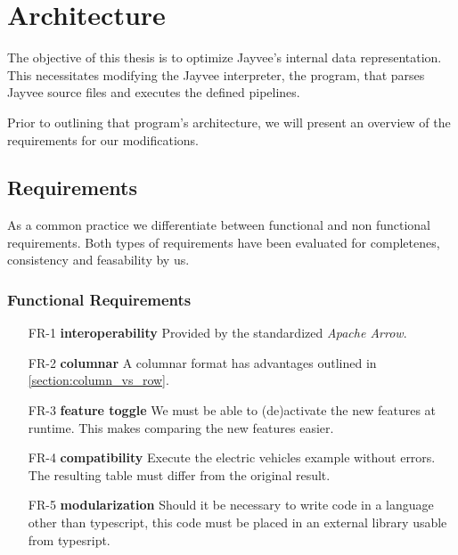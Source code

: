 \chapter{Architecture}
\label{chapter:Architecture}

The objective of this thesis is to optimize Jayvee's internal data representation.
This necessitates modifying the Jayvee interpreter, the program, that parses Jayvee source files and executes the defined pipelines.

Prior to outlining that program's architecture, we will present an overview of the requirements for our modifications.

\section{Requirements}
\label{section:Requirements}

As a common practice we differentiate between functional and non functional requirements.
Both types of requirements have been evaluated for completenes, consistency and feasability by us.

\subsection{Functional Requirements}
\label{subsection:FunctionalRequirements}

\begin{enumerate}
	\item[FR-1] \textbf{interoperability} Provided by the standardized \emph{Apache Arrow}.
	\item[FR-2] \textbf{columnar} A columnar format has advantages outlined in \ref{section:column_vs_row}.
	\item[FR-3]\label{fr:runtime} \textbf{feature toggle} We must be able to (de)activate the new features at runtime.
	      This makes comparing the new features easier. %
	\item[FR-4] \textbf{compatibility} Execute the electric vehicles example %
	      without errors.
	      The resulting table must differ from the original result.
	\item[FR-5] \textbf{modularization} Should it be necessary to write code in a language other than typescript, this code must be placed in an external library usable from typesript.
\end{enumerate}

